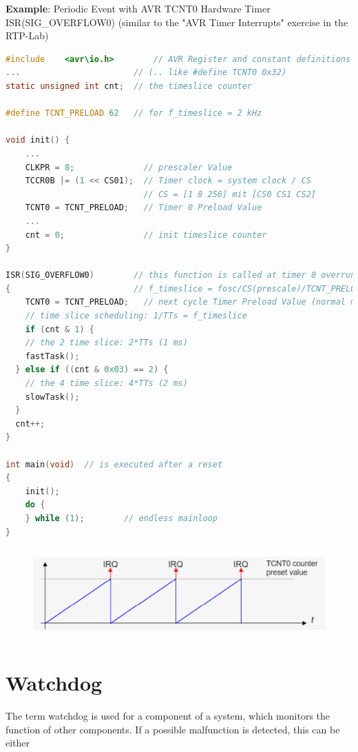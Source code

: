 \textbf{Example}: Periodic Event with AVR TCNT0 Hardware Timer  ISR(SIG\_OVERFLOW0) (similar to the "AVR Timer Interrupts" exercise in the RTP-Lab)\\

\begin{lstlisting}[style=mystyle, language=c]
#include	<avr\io.h>		  // AVR Register and constant definitions
...                       // (.. like #define TCNT0 0x32)
static unsigned int cnt;  // the timeslice counter

#define TCNT_PRELOAD 62   // for f_timeslice = 2 kHz 

void init() {
	...
	CLKPR = 8;              // prescaler Value
	TCCR0B |= (1 << CS01);  // Timer clock = system clock / CS
	                     	// CS = [1 8 256] mit [CS0 CS1 CS2]
	TCNT0 = TCNT_PRELOAD;   // Timer 0 Preload Value
	...
	cnt = 0;                // init timeslice counter
}

ISR(SIG_OVERFLOW0)        // this function is called at timer 0 overrun
{                         // f_timeslice = fosc/CS(prescale)/TCNT_PRELOAD
	TCNT0 = TCNT_PRELOAD;   // next cycle Timer Preload Value (normal mode)
	// time slice scheduling: 1/TTs = f_timeslice
	if (cnt & 1) {
	// the 2 time slice: 2*TTs (1 ms)
	fastTask();                   
  } else if ((cnt & 0x03) == 2) {
	// the 4 time slice: 4*TTs (2 ms)
	slowTask();          
  }
  cnt++;
}

int main(void)  // is executed after a reset
{
	init();        
	do {
	} while (1);		// endless mainloop
}

\end{lstlisting}

    \begin{figure}[h]
    \centering
    \includegraphics[width=12cm, height=3.5cm]{Images/image163.png}
    \label{fig:Fig 116}
    \end{figure}
\newpage
\section{Watchdog}

The term watchdog is used for a component of a system, which monitors the function of other components. If a possible malfunction is detected, this can be either 

